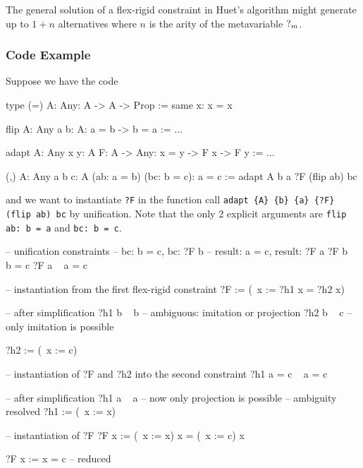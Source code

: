 The general solution of a flex-rigid constraint in Huet's algorithm might
generate up to $1 + n$ alternatives where $n$ is the arity of the metavariable
${?_{m}}$.






\subsubsection{Code Example}

Suppose we have the code
\begin{alba}
    type (=) {A: Any}: A -> A -> Prop :=
        same {x}: x = x

    flip {A: Any} {a b: A}: a = b -> b = a :=
        ...

    adapt {A: Any} {x y: A} {F: A -> Any}: x = y -> F x -> F y :=
        ...

    (,) {A: Any} {a b c: A} (ab: a = b) (bc: b = c): a = c :=
        adapt {A} {b} {a} {?F} (flip ab) bc
\end{alba}
%
and we want to instantiate {\tt ?F} in the function call
{\tt adapt \{A\} \{b\} \{a\} \{?F\} (flip ab) bc}
by unification. Note that the only 2 explicit arguments are
{\tt flip ab: b = a} and {\tt bc: b = c}.

\begin{alba}
    -- unification constraints
    --    bc: b = c,      bc: ?F b
    --    result: a = c,  result: ?F a
    ?F b   ~   b = c
    ?F a   ~   a = c

    -- instantiation from the first flex-rigid constraint
    ?F := (\ x := ?h1 x = ?h2 x)

    -- after simplification
    ?h1 b  ~  b             -- ambiguous: imitation or projection
    ?h2 b  ~  c             -- only imitation is possible

    ?h2 := (\ x := c)

    -- instantiation of ?F and ?h2 into the second constraint
    ?h1 a = c    ~    a = c

    -- after simplification
    ?h1 a  ~  a             -- now only projection is possible
                            -- ambiguity resolved
    ?h1 := (\ x := x)

    -- instantiation of ?F
    ?F x := (\ x := x) x = (\ x := c) x

    ?F x := x = c   -- reduced
\end{alba}






